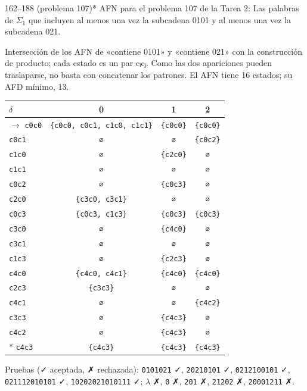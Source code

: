 \documentclass[11pt]{article}
\begin{document}
\begin{ejercicio}{162--188 (problema 107)}{*}
AFN para el problema 107 de la Tarea 2: Las palabras de $\Sigma_1$ que incluyen al menos una vez la subcadena 0101 y al menos una vez la subcadena 021.
\end{ejercicio}
\proc Intersección de los AFN de «contiene 0101» y «contiene 021» con la construcción de producto; cada estado es un par cᵢcⱼ. Como las dos apariciones pueden traslaparse, no basta con concatenar los patrones. El AFN tiene 16 estados; su AFD mínimo, 13.
\begin{center}\small\begin{tabular}{lccc}\toprule
$\delta$ & 0 & 1 & 2 \\\midrule
$\to$ \texttt{c0c0} & \texttt{\{c0c0, c0c1, c1c0, c1c1\}} & \texttt{\{c0c0\}} & \texttt{\{c0c0\}} \\
 \texttt{c0c1} & \texttt{∅} & \texttt{∅} & \texttt{\{c0c2\}} \\
 \texttt{c1c0} & \texttt{∅} & \texttt{\{c2c0\}} & \texttt{∅} \\
 \texttt{c1c1} & \texttt{∅} & \texttt{∅} & \texttt{∅} \\
 \texttt{c0c2} & \texttt{∅} & \texttt{\{c0c3\}} & \texttt{∅} \\
 \texttt{c2c0} & \texttt{\{c3c0, c3c1\}} & \texttt{∅} & \texttt{∅} \\
 \texttt{c0c3} & \texttt{\{c0c3, c1c3\}} & \texttt{\{c0c3\}} & \texttt{\{c0c3\}} \\
 \texttt{c3c0} & \texttt{∅} & \texttt{\{c4c0\}} & \texttt{∅} \\
 \texttt{c3c1} & \texttt{∅} & \texttt{∅} & \texttt{∅} \\
 \texttt{c1c3} & \texttt{∅} & \texttt{\{c2c3\}} & \texttt{∅} \\
 \texttt{c4c0} & \texttt{\{c4c0, c4c1\}} & \texttt{\{c4c0\}} & \texttt{\{c4c0\}} \\
 \texttt{c2c3} & \texttt{\{c3c3\}} & \texttt{∅} & \texttt{∅} \\
 \texttt{c4c1} & \texttt{∅} & \texttt{∅} & \texttt{\{c4c2\}} \\
 \texttt{c3c3} & \texttt{∅} & \texttt{\{c4c3\}} & \texttt{∅} \\
 \texttt{c4c2} & \texttt{∅} & \texttt{\{c4c3\}} & \texttt{∅} \\
$*$ \texttt{c4c3} & \texttt{\{c4c3\}} & \texttt{\{c4c3\}} & \texttt{\{c4c3\}} \\
\bottomrule\end{tabular}\end{center}
Pruebas (✓ aceptada, ✗ rechazada): \texttt{0101021} ✓, \texttt{20210101} ✓, \texttt{0212100101} ✓, \texttt{021112010101} ✓, \texttt{10202021010111} ✓; $\lambda$ ✗, \texttt{0} ✗, \texttt{201} ✗, \texttt{21202} ✗, \texttt{20001211} ✗.
\end{document}
